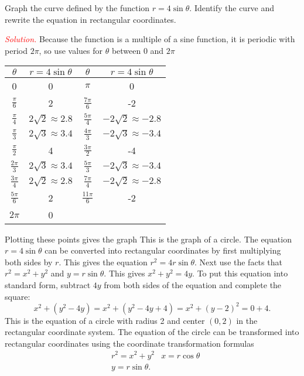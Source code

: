 \documentclass{report}
\begin{document}
    \bigbreak \noindent 
    \begin{exm}
        Graph the curve defined by the function $r=4\sin{\theta}$. Identify the curve and rewrite the equation in rectangular coordinates.
        
    \end{exm}
    \bigbreak \noindent 
    \textcolor{red}{\textit{Solution.}}
    Because the function is a multiple of a sine function, it is periodic with period  $2\pi$, so use values for $\theta$ between 0 and  $2\pi$
    \bigbreak \noindent 
    \begin{center}
        \begin{tabular}{cc|cc}
            \toprule
            \( \theta \) & \( r = 4\sin\theta \) & \( \theta \) & \( r = 4\sin\theta \) \\
            \midrule
            0 & 0 & \( \pi \) & 0 \\
            \( \frac{\pi}{6} \) & 2 & \( \frac{7\pi}{6} \) & -2 \\
            \( \frac{\pi}{4} \) & \( 2\sqrt{2} \approx 2.8 \) & \( \frac{5\pi}{4} \) & \( -2\sqrt{2} \approx -2.8 \) \\
            \( \frac{\pi}{3} \) & \( 2\sqrt{3} \approx 3.4 \) & \( \frac{4\pi}{3} \) & \( -2\sqrt{3} \approx -3.4 \) \\
            \( \frac{\pi}{2} \) & 4 & \( \frac{3\pi}{2} \) & -4 \\
            \( \frac{2\pi}{3} \) & \( 2\sqrt{3} \approx 3.4 \) & \( \frac{5\pi}{3} \) & \( -2\sqrt{3} \approx -3.4 \) \\
            \( \frac{3\pi}{4} \) & \( 2\sqrt{2} \approx 2.8 \) & \( \frac{7\pi}{4} \) & \( -2\sqrt{2} \approx -2.8 \) \\
            \( \frac{5\pi}{6} \) & 2 & \( \frac{11\pi}{6} \) & -2 \\
            \( 2\pi \) & 0 \\
            \bottomrule
        \end{tabular}
     \end{center}
     \bigbreak \noindent 
     Plotting these points gives the graph
     \pagebreak 
     \bigbreak \noindent 
     This is the graph of a circle. The equation \( r = 4\sin\theta \) can be converted into rectangular coordinates by first multiplying both sides by \( r \). This gives the equation \( r^2 = 4r\sin\theta \). Next use the facts that \( r^2 = x^2 + y^2 \) and \( y = r\sin\theta \). This gives \( x^2 + y^2 = 4y \). To put this equation into standard form, subtract \( 4y \) from both sides of the equation and complete the square:
     \[
         x^2 + (y^2 - 4y) = x^2 + (y^2 - 4y + 4) = x^2 + (y - 2)^2 = 0 + 4.
     \]
     This is the equation of a circle with radius 2 and center \( (0, 2) \) in the rectangular coordinate system.
     \bigbreak \noindent 
     The equation of the circle can be transformed into rectangular coordinates using the coordinate transformation formulas
     \begin{align*}
         &r^{2} = x^{2} + y^{2}
         &x = r\cos{\theta} \\
         &y = r\sin{\theta}
     .\end{align*}
     \pagebreak 
\end{document}
